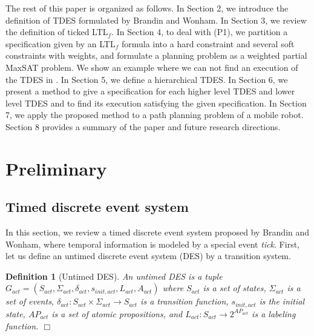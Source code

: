 \documentclass[journal,twoside,web]{IEEEtran}
\newcommand{\qedwhite}{\hfill \ensuremath{\Box}}
\newtheorem{dfn}{Definition}
\begin{document}
%
%
The rest of this paper is organized as follows.
In Section 2, we introduce the definition of TDES formulated by Brandin and Wonham\cite{BW1994}.
In Section 3, we review the definition of ticked LTL$_f$.
In Section 4, to deal with (P1), we partition a specification given by an LTL$_f$ formula into a hard constraint and several soft constraints with weights, and formulate a planning problem as a weighted partial MaxSAT problem.
We show an example where we can not find an execution of the TDES in \cite{KHU2020}.
In Section 5, we define a hierarchical TDES.
In Section 6, we present a method to give a specification for each higher level TDES and lower level TDES and to find its execution satisfying the given specification.
In Section 7, we apply the proposed method to a path planning problem of a mobile robot. 
Section 8 provides a summary of the paper and future research directions.
%
%
\section{Preliminary}
\subsection{Timed discrete event system}\label{tdes}
%
In this section, we review a timed discrete event system proposed by Brandin and Wonham\cite{BW1994}, where temporal information is modeled by a special event {\sl tick}. First, let us define an untimed discrete event system (DES) by a transition system.
%
\begin{dfn}[Untimed DES] \label{def:G_act}
An untimed DES is a tuple $G_{act}=(S_{act}, \Sigma_{act}, \delta_{act}, s_{init,act}, L_{act}, A_{act})$ where $S_{act}$ is a set of states, $\Sigma_{act}$ is a set of events, $\delta_{act} : S_{act} \times \Sigma_{act} \rightarrow S_{act}$ is a transition function, $s_{init,act}$ is the initial state, $AP_{act}$ is a set of atomic propositions, and $L_{act} : S_{act} \rightarrow 2^{AP_{act}}$ is a labeling function. \qedwhite
\end{dfn}
\end{document}
